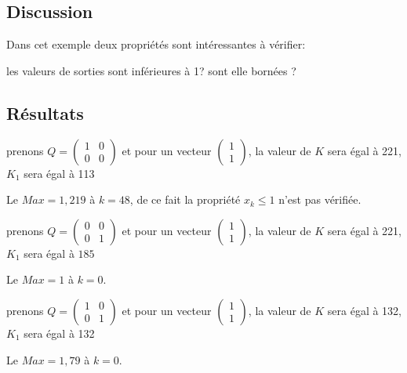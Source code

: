 \subsection{Discussion}
  Dans cet exemple deux propriétés sont intéressantes à vérifier:
  \begin{itemize}
      \itemperso{} les valeurs de sorties sont inférieures à 1?
      \itemperso{} sont elle bornées ?
  \end{itemize}
  
  
  
  
\subsection{Résultats}


\begin{itemize}
    
    prenons $Q= \begin{pmatrix} 
  1 & 0 \\
   0 & 0 
\end{pmatrix}$ et pour un vecteur 
 $\begin{pmatrix} 
  1 \\
   1  
\end{pmatrix}$, la valeur de $K$ sera égal à 221, $K_{1}$ sera égal à 113 
        
   Le $ Max = 1,219 $ à $k=48$, de ce fait la propriété $x_{k} \leq 1$ n'est pas vérifiée.
    
    
     
       prenons $Q= \begin{pmatrix} 
  0 & 0 \\
   0 & 1 
\end{pmatrix}$ et pour un vecteur 
 $\begin{pmatrix} 
  1 \\
   1  
\end{pmatrix}$, la valeur de $K$ sera égal à 221, $K_{1}$ sera égal à $185 $ 
        
   Le $ Max = 1 $ à $k=0$.
     
     
      
       prenons $Q= \begin{pmatrix} 
  1 & 0 \\
   0 & 1 
\end{pmatrix}$ et pour un vecteur 
 $\begin{pmatrix} 
  1 \\
   1  
\end{pmatrix}$, la valeur de $K$ sera égal à 132, $K_{1}$ sera égal à 132  
        
   Le $ Max = 1,79 $ à $k=0$.
      
\end{itemize}










